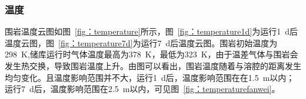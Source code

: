 \subsubsection{温度}
围岩温度云图如图~\ref{fig：temperature}所示，图~\ref{fig：temperature1d}为运行\SI{1}{d}后温度云图，图~\ref{fig：temperature7d}为运行\SI{7}{d}后温度云图。围岩初始温度为\SI{298}{K},储库运行时气体温度最高为\SI{378}{K}，最低为\SI{323}{K}，由于温差气体与围岩会发生热交换，导致围岩温度上升。由图可以看出，围岩温度随着与溶腔的距离发生均匀变化。且温度影响范围并不大，运行\SI{1}{d}后，温度影响范围在在\SI{1.5}{m}以内；运行\SI{7}{d}后，温度影响范围在\SI{2.5}{m}以内，可见图~\ref{fig：temperaturefanwei}。

\begin{figure}[ht!]
    \centering
\end{figure}
